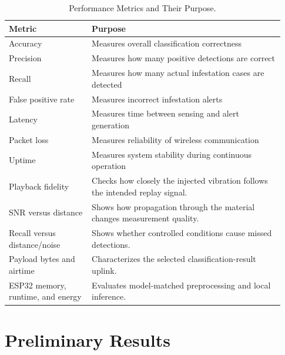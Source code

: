 \documentclass[12pt,a4paper,oneside]{memoir}
\newcommand{\newrevision}[1]{#1}
\begin{document}
\begin{table}[h]
\centering
\caption{Performance Metrics and Their Purpose.}
\label{tab:metrics}
\renewcommand{\arraystretch}{1.3}
\begin{tabular}{@{} p{0.28\linewidth} p{0.65\linewidth} @{}}
\toprule
\textbf{Metric} & \textbf{Purpose} \\
\midrule
Accuracy           & Measures overall classification correctness \\
Precision          & Measures how many positive detections are correct \\
Recall             & Measures how many actual infestation cases are detected \\
False positive rate & Measures incorrect infestation alerts \\
Latency            & Measures time between sensing and alert generation \\
Packet loss        & Measures reliability of wireless communication \\
Uptime             & Measures system stability during continuous operation \\
\newrevision{Playback fidelity} & \newrevision{Checks how closely the injected vibration follows the intended replay signal.} \\
\newrevision{SNR versus distance} & \newrevision{Shows how propagation through the material changes measurement quality.} \\
\newrevision{Recall versus distance/noise} & \newrevision{Shows whether controlled conditions cause missed detections.} \\
\newrevision{Payload bytes and airtime} & \newrevision{Characterizes the selected classification-result uplink.} \\
\newrevision{ESP32 memory, runtime, and energy} & \newrevision{Evaluates model-matched preprocessing and local inference.} \\
\bottomrule
\end{tabular}
\end{table}

\FloatBarrier

\section{\newrevision{Preliminary Results}}
\label{sec:preliminary_results}
\end{document}
